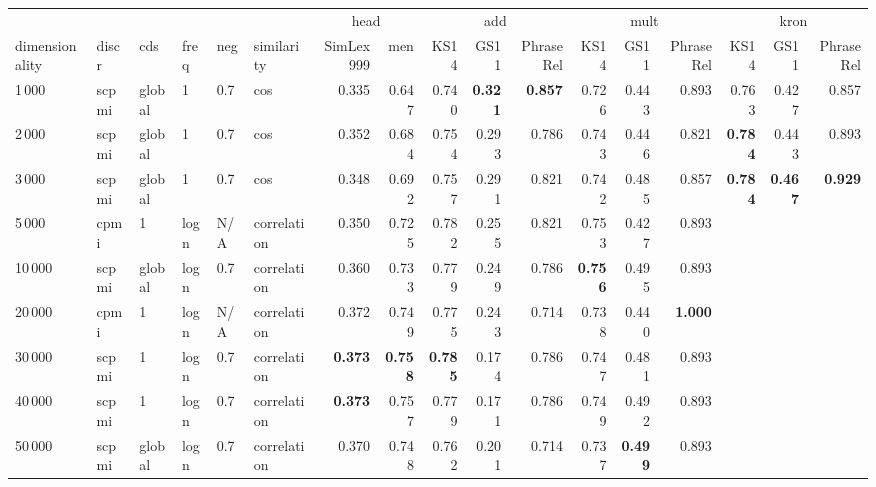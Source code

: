 \begin{tabular}{llllllrrrrrrrrrrr}
\toprule
      &      &   &   &     &             &      \multicolumn{2}{c}{head}         &    \multicolumn{3}{c}{add}                    &   \multicolumn{3}{c}{mult}                    &   \multicolumn{3}{c}{kron}                    \\
  \cmidrule(r){7-8} \cmidrule(r){9-11} \cmidrule(r){12-14} \cmidrule(r){15-17}
  dimensionality & discr & cds & freq & neg & similarity & SimLex999 &    men &   KS14 &   GS11 & PhraseRel &   KS14 &   GS11 & PhraseRel &   KS14 &   GS11 & PhraseRel \\


\midrule
1\,000  & scpmi & global & 1    & 0.7 & cos         &         0.335  &          0.647  &  0.740 &  \textbf{0.321} &     \textbf{0.857} &  0.726 &  0.443 &     0.893 &  0.763 &  0.427 &     0.857 \\
2\,000  & scpmi & global & 1    & 0.7 & cos         &         0.352  &          0.684  &  0.754 &  0.293 &     0.786 &  0.743 &  0.446 &     0.821 &  \textbf{0.784} &  0.443 &     0.893 \\
3\,000  & scpmi & global & 1    & 0.7 & cos         &         0.348  &          0.692  &  0.757 &  0.291 &     0.821 &  0.742 &  0.485 &     0.857 &  \textbf{0.784} &  \textbf{0.467} &     \textbf{0.929} \\
5\,000  & cpmi  & 1      & logn & N/A & correlation &         0.350  &          0.725  &  0.782 &  0.255 &     0.821 &  0.753 &  0.427 &     0.893 &        &        &           \\
10\,000 & scpmi & global & logn & 0.7 & correlation &         0.360  &          0.733  &  0.779 &  0.249 &     0.786 &  \textbf{0.756} &  0.495 &     0.893 &        &        &           \\
20\,000 & cpmi  & 1      & logn & N/A & correlation &         0.372  &          0.749  &  0.775 &  0.243 &     0.714 &  0.738 &  0.440 &     \textbf{1.000} &        &        &           \\
30\,000 & scpmi & 1      & logn & 0.7 & correlation & \textbf{0.373} &  \textbf{0.758} &  \textbf{0.785} &  0.174 &     0.786 &  0.747 &  0.481 &     0.893 &        &        &           \\
40\,000 & scpmi & 1      & logn & 0.7 & correlation & \textbf{0.373} &          0.757  &  0.779 &  0.171 &     0.786 &  0.749 &  0.492 &     0.893 &        &        &           \\
50\,000 & scpmi & global & logn & 0.7 & correlation &         0.370  &          0.748  &  0.762 &  0.201 &     0.714 &  0.737 &  \textbf{0.499} &     0.893 &        &        &           \\
\bottomrule
\end{tabular}

